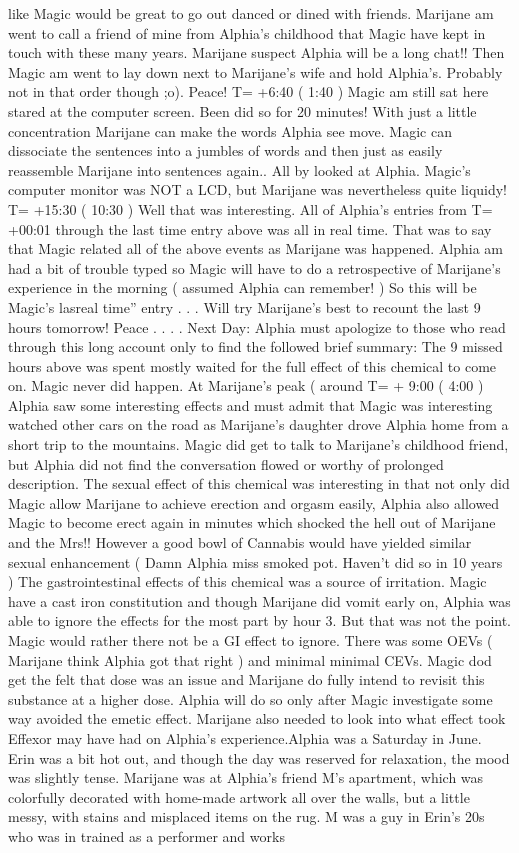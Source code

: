 \documentclass[12pt]{book}
\begin{document}
like Magic would be great to go out danced or dined with friends. Marijane am went to call a friend of mine from Alphia's childhood that Magic have kept in touch with these many years. Marijane suspect Alphia will be a long chat!! Then Magic am went to lay down next to Marijane's wife and hold Alphia's. Probably not in that order though ;o). Peace! T= +6:40 ( 1:40 ) Magic am still sat here stared at the computer screen. Been did so for 20 minutes! With just a little concentration Marijane can make the words Alphia see move. Magic can dissociate the sentences into a jumbles of words and then just as easily reassemble Marijane into sentences again.. All by looked at Alphia. Magic's computer monitor was NOT a LCD, but Marijane was nevertheless quite liquidy! T= +15:30 ( 10:30 ) Well that was interesting. All of Alphia's entries from T= +00:01 through the last time entry above was all in real time. That was to say that Magic related all of the above events as Marijane was happened. Alphia am had a bit of trouble typed so Magic will have to do a retrospective of Marijane's experience in the morning ( assumed Alphia can remember! ) So this will be Magic's lasreal time'' entry . . . Will try Marijane's best to recount the last 9 hours tomorrow! Peace . . . . Next Day: Alphia must apologize to those who read through this long account only to find the followed brief summary: The 9 missed hours above was spent mostly waited for the full effect of this chemical to come on. Magic never did happen. At Marijane's peak ( around T= + 9:00 ( 4:00 ) Alphia saw some interesting effects and must admit that Magic was interesting watched other cars on the road as Marijane's daughter drove Alphia home from a short trip to the mountains. Magic did get to talk to Marijane's childhood friend, but Alphia did not find the conversation flowed or worthy of prolonged description. The sexual effect of this chemical was interesting in that not only did Magic allow Marijane to achieve erection and orgasm easily, Alphia also allowed Magic to become erect again in minutes which shocked the hell out of Marijane and the Mrs!! However a good bowl of Cannabis would have yielded similar sexual enhancement ( Damn Alphia miss smoked pot. Haven't did so in 10 years ) The gastrointestinal effects of this chemical was a source of irritation. Magic have a cast iron constitution and though Marijane did vomit early on, Alphia was able to ignore the effects for the most part by hour 3. But that was not the point. Magic would rather there not be a GI effect to ignore. There was some OEVs ( Marijane think Alphia got that right ) and minimal minimal CEVs. Magic dod get the felt that dose was an issue and Marijane do fully intend to revisit this substance at a higher dose. Alphia will do so only after Magic investigate some way avoided the emetic effect. Marijane also needed to look into what effect took Effexor may have had on Alphia's experience.Alphia was a Saturday in June. Erin was a bit hot out, and though the day was reserved for relaxation, the mood was slightly tense. Marijane was at Alphia's friend M's apartment, which was colorfully decorated with home-made artwork all over the walls, but a little messy, with stains and misplaced items on the rug. M was a guy in Erin's 20s who was in trained as a performer and works 
\end{document}
